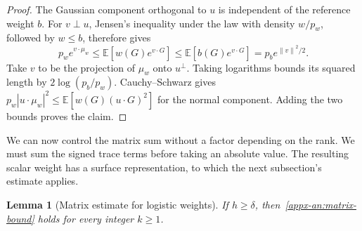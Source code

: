 \documentclass[11pt,letterpaper]{article}
\newtheorem{lemma}{Lemma}
\theoremstyle{remark}
\newcommand{\E}{\mathbb E}
\newcommand{\norm}[1]{\left\lVert#1\right\rVert}
\begin{document}
\begin{proof}
The Gaussian component orthogonal to \(u\) is independent of the
reference weight \(b\). For \(v\perp u\), Jensen's inequality under
the law with density \(w/p_w\), followed by \(w\le b\), therefore gives
\[
 p_we^{v\cdot\mu_w}
 \le\E[w(G)e^{v\cdot G}]
 \le\E[b(G)e^{v\cdot G}]
 =p_be^{\norm v^2/2}.
\]
Take \(v\) to be the projection of \(\mu_w\) onto \(u^\perp\).
Taking logarithms bounds its squared length by
\(2\log(p_b/p_w)\). Cauchy--Schwarz gives
\(p_w|u\cdot\mu_w|^2\le\E[w(G)(u\cdot G)^2]\) for the normal
component. Adding the two bounds proves the claim.
\end{proof}

We can now control the matrix sum without a factor depending on the
rank. We must sum the signed trace terms before taking an absolute value.
The resulting scalar weight has a surface representation, to which
the next subsection's estimate applies.

\begin{lemma}[Matrix estimate for logistic weights]
\label{appx-an:lem:matrix}
If \(h\ge\delta\), then~\eqref{appx-an:matrix-bound} holds for every
integer \(k\ge1\).
\end{lemma}
\end{document}
